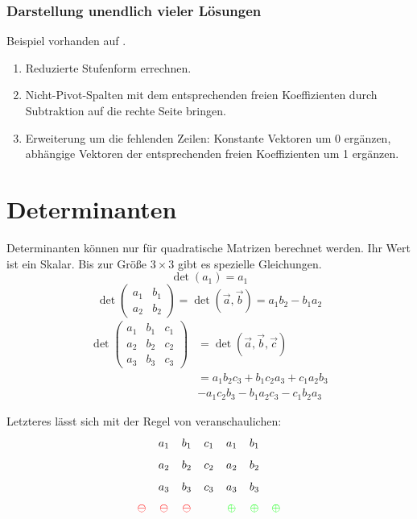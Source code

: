 \subsubsection{Darstellung unendlich vieler Lösungen}
\CheckedBox{} Beispiel vorhanden auf .

\begin{enumerate}
  \item Reduzierte Stufenform errechnen.
  \item Nicht-Pivot-Spalten mit dem entsprechenden freien Koeffizienten durch Subtraktion auf die rechte Seite bringen.
  \item Erweiterung um die fehlenden Zeilen: Konstante Vektoren um 0 er\-gänz\-en, abhängige Vektoren der entsprechenden freien Koeffizienten um 1 er\-gänz\-en.
\end{enumerate}


\section{Determinanten}

Determinanten können nur für quadratische Matrizen berechnet werden.
Ihr Wert ist ein Skalar.
Bis zur Größe $3\times3$ gibt es spezielle Gleichungen.
\[ \det(a_1)=a_1 \]
\[
	\det\begin{pmatrix}
	  a_1 & b_1\\
	  a_2 & b_2
	\end{pmatrix}
	=
	\det(\vec{a},\vec{b}) = a_1 b_2 - b_1 a_2
\]
\begin{align*}
\det\begin{pmatrix}
 a_1 & b_1 & c_1\\
 a_2 & b_2 & c_2\\
 a_3 & b_3 & c_3
\end{pmatrix}
& = \det(\vec{a},\vec{b},\vec{c}) \\
& = a_1 b_2 c_3 + b_1 c_2 a_3 + c_1 a_2 b_3 \\
& - a_1 c_2 b_3 - b_1 a_2 c_3 - c_1 b_2 a_3
\end{align*}

Letzteres lässt sich mit der Regel von  veranschaulichen:
\[
\xySep{5pt}\xymatrix{
        & a_1\ar@{.>}[dddrrr] & b_1\ar@{.>}[dddrrr] & c_1\ar@{.>}[dddlll]\ar@{.>}[dddrrr] & a_1\ar@{.>}[dddlll] & b_1\ar@{.>}[dddlll]\\
        & a_2                 & b_2                 & c_2                                 & a_2                 & b_2\\
        & a_3                 & b_3                 & c_3                                 & a_3                 & b_3\\
\color{red}\ominus & \color{red}\ominus & \color{red}\ominus & & \color{green}\oplus & \color{green}\oplus & \color{green}\oplus
}
\]

